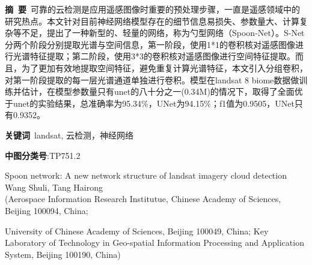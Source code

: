 \documentclass[10pt]{ctexart}
\begin{document}
\setlength{\columnsep}{25pt} 
\date{}


\maketitle
\pagestyle{empty} %
\thispagestyle{empty} %
\noindent\textbf{摘\ 要}\ 可靠的云检测是应用遥感图像时重要的预处理步骤，一直是遥感领域中的研究热点。本文针对目前神经网络模型存在的细节信息易损失、参数量大、计算复杂等不足，提出了一种新型的、轻量的网络，称为勺型网络（Spoon-Net）。S-Net分两个阶段分别提取光谱与空间信息，第一阶段，使用1*1的卷积核对遥感图像进行光谱特征提取；第二阶段，使用3*3的卷积核对遥感图像进行空间特征提取。而且，为了更加有效地提取空间特征，避免重复计算光谱特征，本文引入分组卷积，对第一阶段提取的每一层光谱通道单独进行卷积。模型在landsat 8 biome数据做训练并估计，在模型参数量只有unet的八十分之一(0.34M)的情况下，取得了全面优于unet的实验结果，总准确率为95.34\%，UNet为94.15\%；f1值为0.9505，UNet只有0.9352。

\noindent\textbf{关键词}\ landsat, 云检测，神经网络

\noindent\textbf{中图分类号}:TP751.2

\begin{center}
    \Large
    Spoon network: A new network structure of landsat imagery cloud detection
    \\[10pt]
    \normalsize 
    Wang Shuli, Tang Hairong 
    \\[8pt]
    \small
    (Aerospace Information Research Institutue, Chinese Academy of Sciences, Beijing 100094, China;
    
    University of Chinese Academy of Sciences, Beijing 100049, China; Key Laboratory of Technology in Geo-spatial Information Processing and Application System, Beijing 100190, China)
\end{center}
\end{document}
